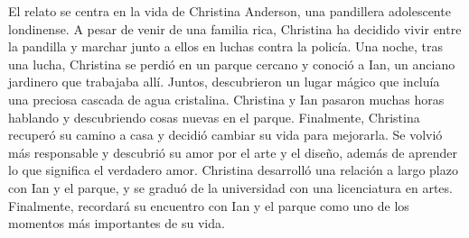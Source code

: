 
El relato se centra en la vida de Christina Anderson, una pandillera adolescente londinense. A pesar de venir de una familia rica, Christina ha decidido vivir entre la pandilla y marchar junto a ellos en luchas contra la policía. Una noche, tras una lucha, Christina se perdió en un parque cercano y conoció a Ian, un anciano jardinero que trabajaba allí. Juntos, descubrieron un lugar mágico que incluía una preciosa cascada de agua cristalina. Christina y Ian pasaron muchas horas hablando y descubriendo cosas nuevas en el parque. Finalmente, Christina recuperó su camino a casa y decidió cambiar su vida para mejorarla. Se volvió más responsable y descubrió su amor por el arte y el diseño, además de aprender lo que significa el verdadero amor. Christina desarrolló una relación a largo plazo con Ian y el parque, y se graduó de la universidad con una licenciatura en artes. Finalmente, recordará su encuentro con Ian y el parque como uno de los momentos más importantes de su vida.